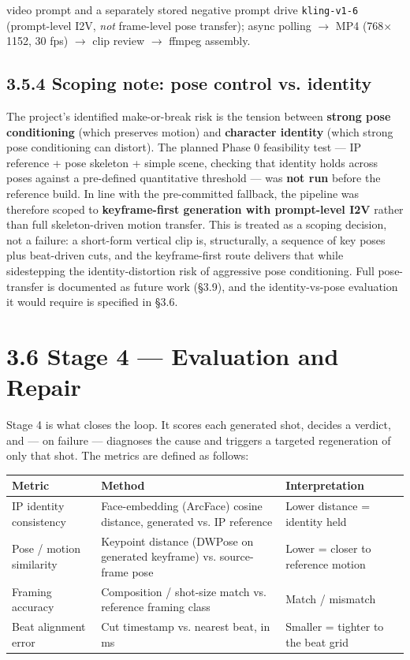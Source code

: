 \documentclass[10pt,twocolumn,letterpaper]{article}
\begin{document}
video prompt and a separately stored negative prompt drive \texttt{kling-v1-6} (prompt-level I2V, \emph{not} frame-level pose transfer); async polling $\rightarrow$ MP4 (768$\times$1152, 30 fps) $\rightarrow$ clip review $\rightarrow$ ffmpeg assembly.

\subsection*{3.5.4 Scoping note: pose control vs. identity}

The project's identified make-or-break risk is the tension between \textbf{strong pose conditioning} (which preserves motion) and \textbf{character identity} (which strong pose conditioning can distort). The planned Phase 0 feasibility test --- IP reference + pose skeleton + simple scene, checking that identity holds across poses against a pre-defined quantitative threshold --- was \textbf{not run} before the reference build. In line with the pre-committed fallback, the pipeline was therefore scoped to \textbf{keyframe-first generation with prompt-level I2V} rather than full skeleton-driven motion transfer. This is treated as a scoping decision, not a failure: a short-form vertical clip is, structurally, a sequence of key poses plus beat-driven cuts, and the keyframe-first route delivers that while sidestepping the identity-distortion risk of aggressive pose conditioning. Full pose-transfer is documented as future work (\S{}3.9), and the identity-vs-pose evaluation it would require is specified in \S{}3.6.

\section*{3.6 Stage 4 --- Evaluation and Repair}

Stage 4 is what closes the loop. It scores each generated shot, decides a verdict, and --- on failure --- diagnoses the cause and triggers a targeted regeneration of only that shot. The metrics are defined as follows:

\begin{table}[t]
\centering
\footnotesize
\begin{tabularx}{\textwidth}{>{\RaggedRight\arraybackslash}X>{\RaggedRight\arraybackslash}X>{\RaggedRight\arraybackslash}X}
\toprule
Metric & Method & Interpretation \\
\midrule
IP identity consistency & Face-embedding (ArcFace) cosine distance, generated vs. IP reference & Lower distance = identity held \\
Pose / motion similarity & Keypoint distance (DWPose on generated keyframe) vs. source-frame pose & Lower = closer to reference motion \\
Framing accuracy & Composition / shot-size match vs. reference framing class & Match / mismatch \\
Beat alignment error & Cut timestamp vs. nearest beat, in ms & Smaller = tighter to the beat grid \\
\bottomrule
\end{tabularx}
\end{table}
\end{document}
